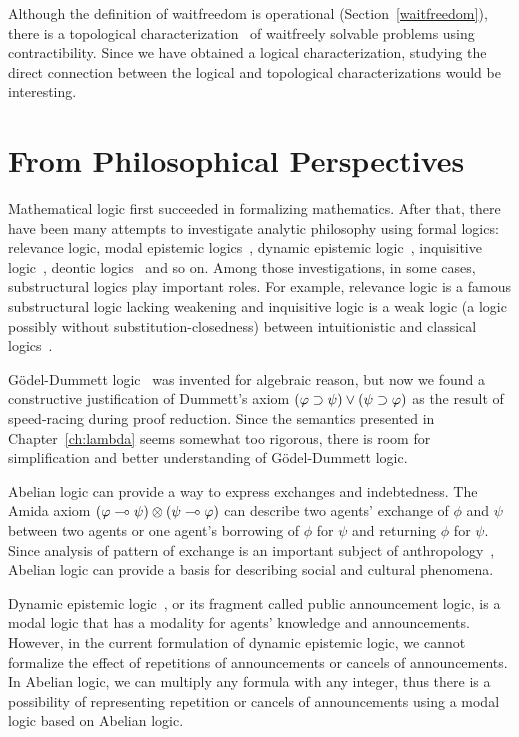 Although the definition of waitfreedom is operational
(Section~\ref{waitfreedom}),
there is a topological characterization~\citep{Herlihy99,Saks:1993vq} of
waitfreely solvable problems using contractibility.
Since we have obtained a logical characterization, studying the direct
connection between the logical and topological characterizations would
be interesting.

\section{From Philosophical Perspectives}

Mathematical logic first succeeded in formalizing mathematics.
After that, there have been many attempts to investigate analytic
philosophy
using formal logics: relevance logic, modal epistemic
logics~\citep{sep-logic-epistemic},
dynamic epistemic logic~\citep{ditmarsch2007dynamic},
inquisitive logic~\citep{ciardelli2011},
deontic logics~\citep{von1951deontic} and
so on.  Among those investigations, in some cases, substructural logics
play important roles.  For example, relevance logic is a famous
substructural logic lacking weakening and inquisitive logic is a weak
logic (a logic possibly without substitution-closedness) between
intuitionistic and classical logics~\citep{ciardelli2011}.

G\"odel-Dummett logic~\citep{dummett59} was invented for algebraic
reason, but now we found a constructive justification of Dummett's axiom
$(\varphi\supset\psi)\lor(\psi\supset\varphi)$ as the result of speed-racing during
proof reduction.  Since the semantics presented in
Chapter~\ref{ch:lambda} seems somewhat too rigorous,
there is room for simplification and better understanding of
G\"odel-Dummett logic.

Abelian logic can provide a way to express
exchanges and indebtedness.
The Amida axiom $(\varphi\multimap
\psi)\otimes(\psi\multimap\varphi)$
can describe two agents' exchange of $\phi$ and $\psi$ between two agents
or one agent's borrowing of $\phi$ for $\psi$ and returning $\phi$ for
$\psi$.
Since analysis of pattern of exchange is an important subject of
anthropology~\citep{kula1920}, Abelian logic can provide a
basis for describing social and cultural phenomena.

Dynamic epistemic logic~\citep{ditmarsch2007dynamic}, or its fragment
called public announcement
logic, is a modal logic that has a modality for agents' knowledge and
announcements.  However, in the current formulation of dynamic epistemic
logic, we cannot formalize the effect of repetitions of announcements or
cancels of announcements.  In Abelian logic, we can multiply any formula
with any integer, thus there is a possibility of representing repetition
or cancels of announcements using a modal logic based on Abelian logic.

